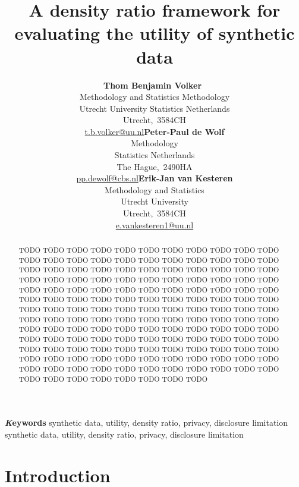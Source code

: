 \documentclass[
]{article}
\title{A density ratio framework for evaluating the utility of synthetic
data}
\author{\textbf{Thom Benjamin
Volker}~\orcidlink{0000-0002-2408-7820}\\Methodology and Statistics
\textbar{} Methodology\\Utrecht University \textbar{} Statistics
Netherlands\\Utrecht,\ 3584CH\\\href{mailto:t.b.volker@uu.nl}{t.b.volker@uu.nl}\asep\textbf{Peter-Paul
de Wolf}\\Methodology\\Statistics Netherlands\\The
Hague,\ 2490HA\\\href{mailto:pp.dewolf@cbs.nl}{pp.dewolf@cbs.nl}\asep\textbf{Erik-Jan
van Kesteren}\\Methodology and Statistics\\Utrecht
University\\Utrecht,\ 3584CH\\\href{mailto:e.vankesteren1@uu.nl}{e.vankesteren1@uu.nl}}
\date{}
\begin{document}
\maketitle
\begin{abstract}
TODO TODO TODO TODO TODO TODO TODO TODO TODO TODO TODO TODO TODO TODO
TODO TODO TODO TODO TODO TODO TODO TODO TODO TODO TODO TODO TODO TODO
TODO TODO TODO TODO TODO TODO TODO TODO TODO TODO TODO TODO TODO TODO
TODO TODO TODO TODO TODO TODO TODO TODO TODO TODO TODO TODO TODO TODO
TODO TODO TODO TODO TODO TODO TODO TODO TODO TODO TODO TODO TODO TODO
TODO TODO TODO TODO TODO TODO TODO TODO TODO TODO TODO TODO TODO TODO
TODO TODO TODO TODO TODO TODO TODO TODO TODO TODO TODO TODO TODO TODO
TODO TODO TODO TODO TODO TODO TODO TODO TODO TODO TODO TODO TODO TODO
TODO TODO TODO TODO TODO TODO TODO TODO TODO TODO TODO TODO TODO TODO
TODO TODO TODO TODO TODO TODO TODO TODO TODO TODO TODO TODO TODO TODO
TODO TODO TODO TODO TODO TODO TODO TODO TODO TODO TODO
\end{abstract}
{\bfseries \emph Keywords}
\def\sep{\textbullet\ }
synthetic data, utility, density ratio, privacy, disclosure
limitation \sep 
synthetic data, utility, density ratio, privacy, disclosure limitation

\ifdefined\Shaded\renewenvironment{Shaded}{\begin{tcolorbox}[boxrule=0pt, interior hidden, frame hidden, borderline west={3pt}{0pt}{shadecolor}, sharp corners, breakable, enhanced]}{\end{tcolorbox}}\fi

\hypertarget{introduction}{%
\section{Introduction}\label{introduction}}
\end{document}
